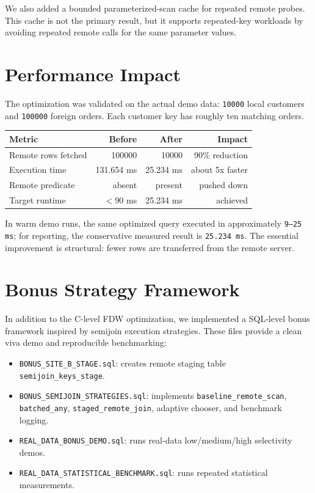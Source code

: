 \documentclass[10pt,a4paper]{article}
\begin{document}
We also added a bounded parameterized-scan cache for repeated remote probes. This cache is not the primary result, but it supports repeated-key workloads by avoiding repeated remote calls for the same parameter values.

\section{Performance Impact}

The optimization was validated on the actual demo data: \texttt{10000} local customers and \texttt{100000} foreign orders. Each customer key has roughly ten matching orders.

\begin{table}[h]
\centering
\small
\begin{tabular}{lrrr}
\toprule
\textbf{Metric} & \textbf{Before} & \textbf{After} & \textbf{Impact} \\
\midrule
Remote rows fetched & 100000 & 10000 & 90\% reduction \\
Execution time & 131.654 ms & 25.234 ms & about 5x faster \\
Remote predicate & absent & present & pushed down \\
Target runtime & $<90$ ms & 25.234 ms & achieved \\
\bottomrule
\end{tabular}
\end{table}

In warm demo runs, the same optimized query executed in approximately \texttt{9--25 ms}; for reporting, the conservative measured result is \texttt{25.234 ms}. The essential improvement is structural: fewer rows are transferred from the remote server.

\section{Bonus Strategy Framework}

In addition to the C-level FDW optimization, we implemented a SQL-level bonus framework inspired by semijoin execution strategies. These files provide a clean viva demo and reproducible benchmarking:

\begin{itemize}
    \item \texttt{BONUS\_SITE\_B\_STAGE.sql}: creates remote staging table \texttt{semijoin\_keys\_stage}.
    \item \texttt{BONUS\_SEMIJOIN\_STRATEGIES.sql}: implements \texttt{baseline\_remote\_scan}, \texttt{batched\_any}, \texttt{staged\_remote\_join}, adaptive chooser, and benchmark logging.
    \item \texttt{REAL\_DATA\_BONUS\_DEMO.sql}: runs real-data low/medium/high selectivity demos.
    \item \texttt{REAL\_DATA\_STATISTICAL\_BENCHMARK.sql}: runs repeated statistical measurements.
\end{itemize}
\end{document}
